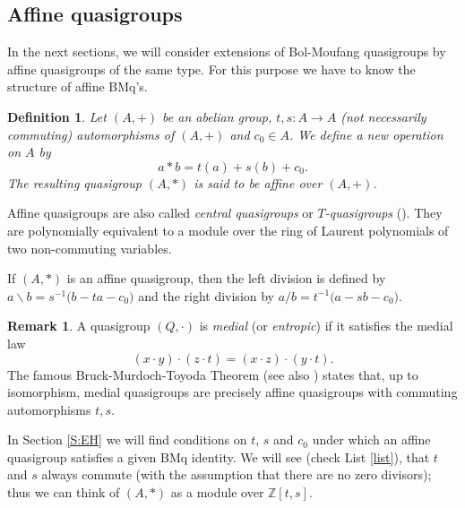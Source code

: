\documentclass[11pt]{amsart}
\newtheorem{definition}[theorem]{Definition}
\theoremstyle{definition}
\newtheorem{remark}[theorem]{Remark}
\begin{document}
\subsection{Affine quasigroups}\label{Ss:AMBMQ} %
In the next sections, we will consider extensions of Bol-Moufang quasigroups by affine quasigroups of the same type. For this purpose we have to know the structure of affine BMq's. 
\begin{definition}
Let $(A,+)$ be an abelian group, $t,s\colon A\rightarrow A$ (not necessarily commuting) automorphisms of $(A,+)$ and $c_0\in A$. We define a new operation on $A$ by
\begin{equation}
a\ast b=t(a)+s(b)+c_0.    
\end{equation}
The resulting quasigroup $(A,\ast)$ is said to be \emph{affine} over $(A,+)$.
\end{definition}
Affine quasigroups are also called \emph{central quasigroups} or \emph{$T$-quasigroups} (\cite[Section 1.4.4.3]{Shch}). They are polynomially equivalent to a module over the ring of Laurent polynomials of two non-commuting variables.

If $(A,\ast)$ is an affine quasigroup, then the left division is defined by $a\backslash b=s^{-1}\big(b-ta-c_0\big)$ and the right division by $a/ b= t^{-1}\big(a-sb-c_0\big)$. 

\begin{remark}
A quasigroup $(Q,\cdot)$ is \emph{medial} (or \emph{entropic}) if it satisfies the medial law
\begin{equation}
(x\cdot y)\cdot (z\cdot t)=(x\cdot z)\cdot (y\cdot t).
\end{equation}
The famous Bruck-Murdoch-Toyoda Theorem \cite{Bruc,Mur,Toy} (see also \cite[Theorem 2.65]{Shch}) states that, up to isomorphism, medial quasigroups are precisely affine quasigroups with commuting automorphisms $t,s$.
\end{remark}

 In Section \ref{S:EH} we will find conditions on $t$, $s$ and $c_0$ under which an affine quasigroup satisfies a given BMq identity. We will see (check List \ref{list}), that $t$ and $s$ always commute (with the assumption that there are no zero divisors); thus we can think of $(A,\ast)$ as a module over $\mathbb{Z}[t,s]$. 


\end{document}
